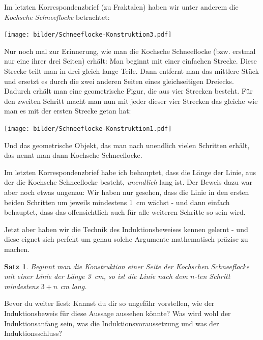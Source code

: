 \documentclass[a4paper,ngerman,12pt]{scrartcl}
\theoremstyle{definition}
\theoremstyle{plain}
\newtheorem{satz}[defn]{Satz}
\theoremstyle{remark}
\begin{document}
Im letzten Korrespondenzbrief (zu Fraktalen) haben wir unter anderem die \emph{Kochsche Schneeflocke} betrachtet:
\begin{center}
	\texttt{[image: bilder/Schneeflocke-Konstruktion3.pdf]}
\end{center}
Nur noch mal zur Erinnerung, wie man die Kochsche Schneeflocke (bzw. erstmal nur eine ihrer drei Seiten) erhält: Man beginnt mit einer einfachen Strecke. Diese Strecke teilt man in drei gleich lange Teile. Dann entfernt man das mittlere Stück und ersetzt es durch die zwei anderen Seiten eines gleichseitigen Dreiecks. Dadurch erhält man eine geometrische Figur, die aus vier Strecken besteht. Für den zweiten Schritt macht man nun mit jeder dieser vier Strecken das gleiche wie man es mit der ersten Strecke getan hat:
\begin{center}
	\texttt{[image: bilder/Schneeflocke-Konstruktion1.pdf]}
\end{center}
Und das geometrische Objekt, das man \glqq nach unendlich vielen Schritten\grqq{} erhält, das nennt man dann Kochsche Schneeflocke.

Im letzten Korrespondenzbrief habe ich behauptet, dass die Länge der Linie, aus der die Kochsche Schneeflocke besteht, \emph{unendlich} lang ist. Der Beweis dazu war aber noch etwas ungenau: Wir haben nur gesehen, dass die Linie in den ersten beiden Schritten um jeweils mindestens \SI{1}{\cm} wächst - und dann einfach behauptet, dass das \glqq offensichtlich\grqq{} auch für alle weiteren Schritte so sein wird.

Jetzt aber haben wir die Technik des Induktionsbeweises kennen gelernt - und diese eignet sich perfekt um genau solche Argumente mathematisch präzise zu machen. 

\begin{satz}
	Beginnt man die Konstruktion einer Seite der Kochschen Schneeflocke mit einer Linie der Länge \SI{3}{\cm}, so ist die Linie nach dem $n$-ten Schritt mindestens $3+n$ \si{\cm} lang.
\end{satz}

Bevor du weiter liest: Kannst du dir so ungefähr vorstellen, wie der Induktionsbeweis für diese Aussage aussehen könnte? Was wird wohl der Induktionsanfang sein, was die Induktionsvoraussetzung und was der Induktionsschluss?
\end{document}
